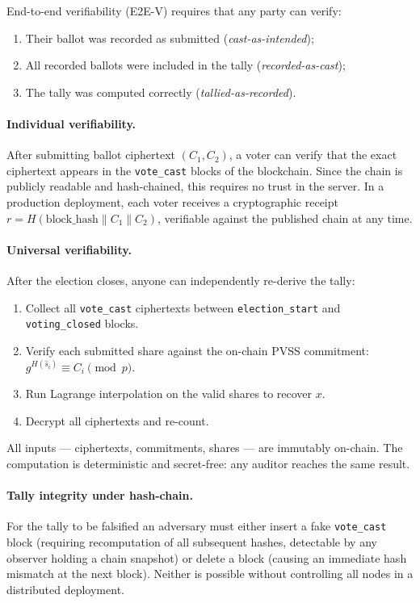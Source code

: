 \documentclass[12pt,a4paper]{article}
\theoremstyle{definition}
\theoremstyle{remark}
\begin{document}
End-to-end verifiability (E2E-V) requires that any party can verify:
\begin{enumerate}
  \item Their ballot was recorded as submitted (\emph{cast-as-intended});
  \item All recorded ballots were included in the tally (\emph{recorded-as-cast});
  \item The tally was computed correctly (\emph{tallied-as-recorded}).
\end{enumerate}

\paragraph{Individual verifiability.}
After submitting ballot ciphertext $(C_1, C_2)$, a voter can verify that
the exact ciphertext appears in the \texttt{vote\_cast} blocks of the
blockchain. Since the chain is publicly readable and hash-chained, this
requires no trust in the server.
In a production deployment, each voter receives a cryptographic receipt
$r = H(\text{block\_hash} \| C_1 \| C_2)$,
verifiable against the published chain at any time.

\paragraph{Universal verifiability.}
After the election closes, anyone can independently re-derive the tally:
\begin{enumerate}
  \item Collect all \texttt{vote\_cast} ciphertexts between
    \texttt{election\_start} and \texttt{voting\_closed} blocks.
  \item Verify each submitted share against the on-chain PVSS commitment:
    $g^{H(\hat{s}_i)} \equiv C_i \pmod{p}$.
  \item Run Lagrange interpolation on the valid shares to recover $x$.
  \item Decrypt all ciphertexts and re-count.
\end{enumerate}
All inputs — ciphertexts, commitments, shares — are immutably on-chain.
The computation is deterministic and secret-free: any auditor reaches
the same result.

\paragraph{Tally integrity under hash-chain.}
For the tally to be falsified an adversary must either insert a fake
\texttt{vote\_cast} block (requiring recomputation of all subsequent
hashes, detectable by any observer holding a chain snapshot) or delete
a block (causing an immediate hash mismatch at the next block).
Neither is possible without controlling all nodes in a distributed
deployment.
\end{document}
